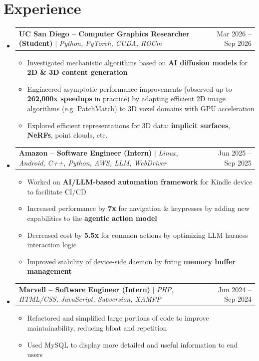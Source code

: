 \documentclass[letterpaper,11pt]{article}
\makeatletter
\newcommand{\resumeItem}[1]{
  \item\small{
    {#1 \vspace{-2pt}}
  }
}
\newcommand{\resumeProjectHeading}[2]{
    \item
    \begin{tabular*}{0.97\textwidth}{l@{\extracolsep{\fill}}r}
      \small#1 & #2 \\
    \end{tabular*}\vspace{-7pt}
}
\newcommand{\resumeSubHeadingListStart}{\begin{itemize}[leftmargin=0.15in, label={}]}
\newcommand{\resumeSubHeadingListEnd}{\end{itemize}}
\newcommand{\resumeItemListStart}{\begin{itemize}}
\newcommand{\resumeItemListEnd}{\end{itemize}\vspace{-5pt}}
\makeatother
\begin{document}
\section{Experience}
    \resumeSubHeadingListStart
        \resumeProjectHeading
            {\textbf{UC San Diego -- Computer Graphics Researcher (Student)} $\mid$ \emph{Python, PyTorch, CUDA, ROCm}}{Mar 2026 -- Sep 2026}
            \resumeItemListStart
                \resumeItem{Investigated mechanistic algorithms based on \textbf{AI diffusion models} for \textbf{2D \& 3D content generation}}
                \resumeItem{Engineered asymptotic performance improvements (observed up to \textbf{262,000x speedups} in practice) by adapting efficient 2D image algorithms (e.g. PatchMatch) to 3D voxel domains with GPU acceleration}
                \resumeItem{Explored efficient representations for 3D data: \textbf{implicit surfaces}, \textbf{NeRFs}, point clouds, etc.}
            \resumeItemListEnd
        \resumeProjectHeading
            {\textbf{Amazon -- Software Engineer (Intern)} $\mid$ \emph{Linux, Android, C++, Python, AWS, LLM, WebDriver}}{Jun 2025 -- Sep 2025}
            \resumeItemListStart
                \resumeItem{Worked on \textbf{AI/LLM-based automation framework} for Kindle device to facilitate CI/CD}
                \resumeItem{Increased performance by \textbf{7x} for navigation \& keypresses by adding new capabilities to the \textbf{agentic action model}}
                \resumeItem{Decreased cost by \textbf{5.5x} for common actions by optimizing LLM harness interaction logic}
                \resumeItem{Improved stability of device-side daemon by fixing \textbf{memory buffer management}}
            \resumeItemListEnd
        \resumeProjectHeading
            {\textbf{Marvell -- Software Engineer (Intern)} $\mid$ \emph{PHP, HTML/CSS, JavaScript, Subversion, XAMPP}}{Jun 2024 -- Sep 2024}
            \resumeItemListStart
                \resumeItem{Refactored and simplified large portions of code to improve maintainability, reducing bloat and repetition}
                \resumeItem{Used MySQL to display more detailed and useful information to end users}
            \resumeItemListEnd
    \resumeSubHeadingListEnd
\end{document}
